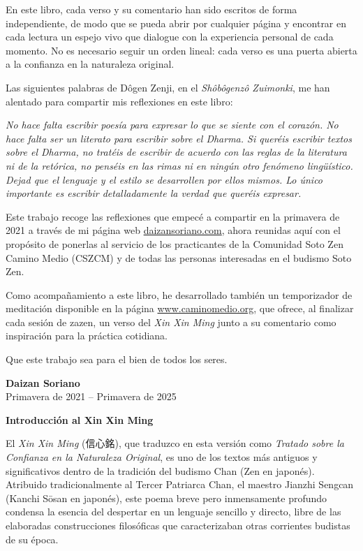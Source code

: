 \documentclass[
  a5paperpaper,
]{article}
\begin{document}
En este libro, cada verso y su comentario han sido escritos de forma
independiente, de modo que se pueda abrir por cualquier página y
encontrar en cada lectura un espejo vivo que dialogue con la experiencia
personal de cada momento. No es necesario seguir un orden lineal: cada
verso es una puerta abierta a la confianza en la naturaleza original.

Las siguientes palabras de Dôgen Zenji, en el \emph{Shôbôgenzô
Zuimonki}, me han alentado para compartir mis reflexiones en este libro:

\emph{No hace falta escribir poesía para expresar lo que se siente con
el corazón. No hace falta ser un literato para escribir sobre el Dharma.
Si queréis escribir textos sobre el Dharma, no tratéis de escribir de
acuerdo con las reglas de la literatura ni de la retórica, no penséis en
las rimas ni en ningún otro fenómeno lingüístico. Dejad que el lenguaje
y el estilo se desarrollen por ellos mismos. Lo único importante es
escribir detalladamente la verdad que queréis expresar.}

Este trabajo recoge las reflexiones que empecé a compartir en la
primavera de 2021 a través de mi página web
\href{https://daizansoriano.com}{daizansoriano.com}, ahora reunidas aquí
con el propósito de ponerlas al servicio de los practicantes de la
Comunidad Soto Zen Camino Medio (CSZCM) y de todas las personas
interesadas en el budismo Soto Zen.

Como acompañamiento a este libro, he desarrollado también un
temporizador de meditación disponible en la página
\href{https://www.caminomedio.org}{www.caminomedio.org}, que ofrece, al
finalizar cada sesión de zazen, un verso del \emph{Xin Xin Ming} junto a
su comentario como inspiración para la práctica cotidiana.

Que este trabajo sea para el bien de todos los seres.

\textbf{Daizan Soriano}\\
Primavera de 2021 -- Primavera de 2025

\newpage

\begin{center}\textbf{Introducción al Xin Xin Ming}\end{center}

El \emph{Xin Xin Ming} (信心銘), que traduzco en esta versión como
\emph{Tratado sobre la Confianza en la Naturaleza Original}, es uno de
los textos más antiguos y significativos dentro de la tradición del
budismo Chan (Zen en japonés). Atribuido tradicionalmente al Tercer
Patriarca Chan, el maestro Jianzhi Sengcan (Kanchi Sōsan en japonés),
este poema breve pero inmensamente profundo condensa la esencia del
despertar en un lenguaje sencillo y directo, libre de las elaboradas
construcciones filosóficas que caracterizaban otras corrientes budistas
de su época.
\end{document}
